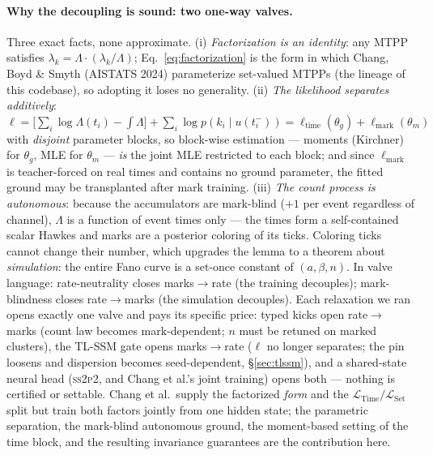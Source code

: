 \documentclass[11pt]{article}
\newcommand{\sspp}{\textsc{ss2p2}}
\begin{document}
\paragraph{Why the decoupling is sound: two one-way valves.} Three exact facts,
none approximate. (i) \emph{Factorization is an identity}: any MTPP satisfies
$\lambda_k=\Lambda\cdot(\lambda_k/\Lambda)$; Eq.~\eqref{eq:factorization} is the
form in which Chang, Boyd \& Smyth (AISTATS 2024) parameterize set-valued
MTPPs (the lineage of this codebase), so adopting it loses no generality.
(ii) \emph{The likelihood separates additively}:
$\ell=\big[\sum_i\log\Lambda(t_i)-\int\Lambda\big]
+\sum_i\log p(k_i\mid u(t_i^-))
=\ell_{\mathrm{time}}(\theta_g)+\ell_{\mathrm{mark}}(\theta_m)$
with \emph{disjoint} parameter blocks, so block-wise estimation --- moments
(Kirchner) for $\theta_g$, MLE for $\theta_m$ --- \emph{is} the joint MLE
restricted to each block; and since $\ell_{\mathrm{mark}}$ is teacher-forced on
real times and contains no ground parameter, the fitted ground may be
transplanted after mark training. (iii) \emph{The count process is autonomous}:
because the accumulators are mark-blind ($+1$ per event regardless of channel),
$\Lambda$ is a function of event times only --- the times form a self-contained
scalar Hawkes and marks are a posterior coloring of its ticks. Coloring ticks
cannot change their number, which upgrades the lemma to a theorem about
\emph{simulation}: the entire Fano curve is a set-once constant of
$(a,\beta,n)$. In valve language: rate-neutrality closes marks$\to$rate (the
training decouples); mark-blindness closes rate$\to$marks (the simulation
decouples). Each relaxation we ran opens exactly one valve and pays its
specific price: typed kicks open rate$\to$marks (count law becomes
mark-dependent; $n$ must be retuned on marked clusters), the TL-SSM gate opens
marks$\to$rate ($\ell$ no longer separates; the pin loosens and dispersion
becomes seed-dependent, \S\ref{sec:tlssm}), and a shared-state neural head
(\sspp{}, and Chang et al.'s joint training) opens both --- nothing is
certified or settable. Chang et al.\ supply the factorized \emph{form} and the
$\mathcal{L}_{\mathrm{Time}}/\mathcal{L}_{\mathrm{Set}}$ split but train both
factors jointly from one hidden state; the parametric separation, the
mark-blind autonomous ground, the moment-based setting of the time block, and
the resulting invariance guarantees are the contribution here.
\end{document}
